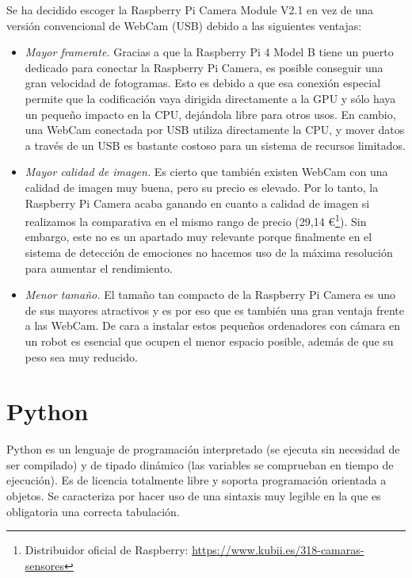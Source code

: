 Se ha decidido escoger la Raspberry Pi Camera Module V2.1 en vez de una versión convencional de WebCam (USB) debido a las siguientes ventajas:

\begin{itemize}
    \item \textit{Mayor framerate.} Gracias a que la Raspberry Pi 4 Model B tiene un puerto dedicado para conectar la Raspberry Pi Camera, es posible conseguir una gran velocidad de fotogramas. Esto es debido a que esa conexión especial permite que la codificación vaya dirigida directamente a la GPU y sólo haya un pequeño impacto en la CPU, dejándola libre para otros usos. En cambio, una WebCam conectada por USB utiliza directamente la CPU, y mover datos a través de un USB es bastante costoso para un sistema de recursos limitados.
    
    \item \textit{Mayor calidad de imagen.} Es cierto que también existen WebCam con una calidad de imagen muy buena, pero su precio es elevado. Por lo tanto, la Raspberry Pi Camera acaba ganando en cuanto a calidad de imagen si realizamos la comparativa en el mismo rango de precio (29,14 \euro\footnote{Distribuidor oficial de Raspberry: \url{https://www.kubii.es/318-camaras-sensores}}). Sin embargo, este no es un apartado muy relevante porque finalmente en el sistema de detección de emociones no hacemos uso de la máxima resolución para aumentar el rendimiento.
    
    \item \textit{Menor tamaño.} El tamaño tan compacto de la Raspberry Pi Camera es uno de sus mayores atractivos y es por eso que es también una gran ventaja frente a las WebCam. De cara a instalar estos pequeños ordenadores con cámara en un robot es esencial que ocupen el menor espacio posible, además de que su peso sea muy reducido.
\end{itemize}

\section{Python}

Python es un lenguaje de programación interpretado (se ejecuta sin necesidad de ser compilado) y de tipado dinámico (las variables se comprueban en tiempo de ejecución). Es de licencia totalmente libre y soporta programación orientada a objetos. Se caracteriza por hacer uso de una sintaxis muy legible en la que es obligatoria una correcta tabulación. 

